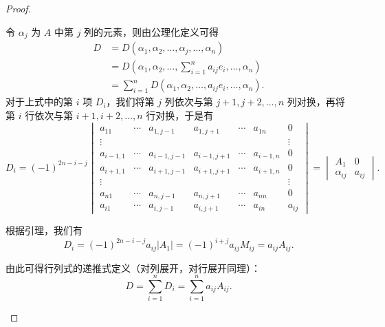 \begin{proof}
\begin{enumerate}
            令 $\alpha_j$ 为 $A$ 中第 $j$ 列的元素，则由公理化定义可得
            \begin{align*}
                D &= D(\alpha_1, \alpha_2, \ldots, \alpha_j, \ldots, \alpha_n) \\
                  &= D(\alpha_1, \alpha_2, \ldots, \sum_{i=1}^n a_{ij} e_i, \ldots, \alpha_n) \\
                  &= \sum_{i=1}^n D(\alpha_1, \alpha_2, \ldots, a_{ij} e_i, \ldots, \alpha_n).
            \end{align*}
            对于上式中的第 $i$ 项 $D_i$，我们将第 $j$ 列依次与第 $j+1, j+2, \ldots, n$ 列对换，再将第 $i$ 行依次与第 $i+1, i+2, \ldots, n$ 行对换，于是有
            \[
                D_i = (-1)^{2n-i-j} \begin{vmatrix}
                    a_{11}     & \cdots & a_{1, j-1}   & a_{1, j+1}   & \cdots & a_{1n}     & 0      \\
                    \vdots     &        &              &              &        &            & \vdots \\
                    a_{i-1, 1} & \cdots & a_{i-1, j-1} & a_{i-1, j+1} & \cdots & a_{i-1, n} & 0      \\
                    a_{i+1, 1} & \cdots & a_{i+1, j-1} & a_{i+1, j+1} & \cdots & a_{i+1, n} & 0      \\
                    \vdots     &        &              &              &        &            & \vdots \\
                    a_{n1}     & \cdots & a_{n, j-1}   & a_{n, j+1}   & \cdots & a_{nn}     & 0      \\
                    a_{i1}     & \cdots & a_{i, j-1}   & a_{i, j+1}   & \cdots & a_{in}     & a_{ij}
                \end{vmatrix} = \begin{vmatrix}
                    A_1         & 0      \\
                    \alpha_{ij} & a_{ij}
                \end{vmatrix}.
            \]

            根据引理，我们有
            \[
                D_i = (-1)^{2n-i-j} a_{ij} |A_1| = (-1)^{i+j} a_{ij} M_{ij} = a_{ij} A_{ij}.
            \]

            由此可得行列式的递推式定义（对列展开，对行展开同理）：
            \[
                D = \sum_{i=1}^n D_i = \sum_{i=1}^n a_{ij} A_{ij}.
            \]


\end{enumerate}
\end{proof}
